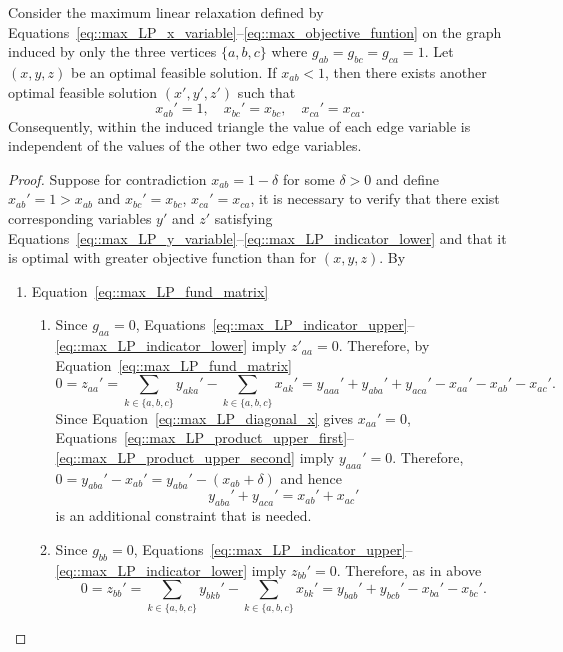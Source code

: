 \begin{proposition}\label{prop::triangle_edge_independence}
  Consider the maximum linear relaxation defined by Equations~\eqref{eq::max_LP_x_variable}--\eqref{eq::max_objective_funtion} on the graph induced by only the three vertices $\{a,b,c\}$ where $g_{ab}=g_{bc}=g_{ca}=1$. Let $(x,y,z)$ be an optimal feasible solution. If $x_{ab}<1$, then there exists another optimal feasible solution $(x',y',z')$ such that
  \[
  x_{ab}'=1,\quad x_{bc}'=x_{bc},\quad x_{ca}'=x_{ca}.
  \]
  Consequently, within the induced triangle the value of each edge variable is independent of the values of the other two edge variables.
\end{proposition}
\begin{proof}
  Suppose for contradiction $x_{ab}=1-\delta$ for some $\delta>0$ and define $x_{ab}' = 1 > x_{ab}$ and $x_{bc}'=x_{bc}$, $x_{ca}'=x_{ca}$, it is necessary to verify that there exist corresponding variables $y'$ and $z'$ satisfying Equations~\eqref{eq::max_LP_y_variable}--\eqref{eq::max_LP_indicator_lower} and that it is optimal with greater objective function than for $(x,y,z)$. By 
  \begin{enumerate}[label=\Alph*.] 
    \item Equation~\eqref{eq::max_LP_fund_matrix}
      \begin{enumerate}[label=(\roman*)]
        \item Since $g_{aa} = 0$, Equations~\eqref{eq::max_LP_indicator_upper}--\eqref{eq::max_LP_indicator_lower} imply $z'_{aa} = 0$. Therefore, by     Equation~\eqref{eq::max_LP_fund_matrix}
          \[
          0 = z_{aa}' = \sum_{k\in\{a,b,c\}}y_{aka}' -\sum_{k\in\{a,b,c\}}x_{ak}' = y_{aaa}'+y_{aba}'+y_{aca}' -x_{aa}'-x_{ab}'-x_{ac}'.
          \]
          Since Equation~\eqref{eq::max_LP_diagonal_x} gives $x_{aa}'=0$, Equations~\eqref{eq::max_LP_product_upper_first}--\eqref{eq::max_LP_product_upper_second} imply $y_{aaa}'=0$. Therefore, $0 = y_{aba}'-x_{ab}' = y_{aba}'-(x_{ab}+\delta)$ and hence 
          \begin{equation} \label{eq::y_aba_aca}
            y_{aba}'+y_{aca}'=x_{ab}'+x_{ac}'
          \end{equation} 
          is an additional constraint that is needed.
        \item Since $g_{bb}=0$, Equations~\eqref{eq::max_LP_indicator_upper}--\eqref{eq::max_LP_indicator_lower} imply $z_{bb}'=0$. Therefore, as in above
          \[
          0 = z_{bb}' = \sum_{k\in\{a,b,c\}}y_{bkb}' -\sum_{k\in\{a,b,c\}}x_{bk}' = y_{bab}' + y_{bcb}' - x_{ba}' - x_{bc}'.
\]
\end{enumerate}
\end{enumerate}
\end{proof}
